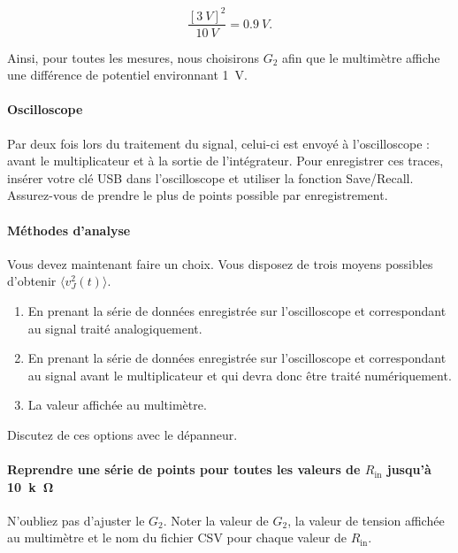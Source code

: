 \documentclass[12pt,oneside,letterpaper]{article}
\begin{document}
\begin{equation*}
\frac{[\SI{3}{V}]^2}{\SI{10}{V}}=\SI{0.9}{V}.
\end{equation*}


Ainsi, pour toutes les mesures, nous choisirons $G_2$ afin que le multimètre affiche une différence de potentiel environnant \SI{1}{V}.


\paragraph{Oscilloscope}Par deux fois lors du traitement du signal, celui-ci est envoyé à l'oscilloscope : avant le multiplicateur et à la sortie de l'intégrateur. Pour enregistrer ces traces, insérer votre clé USB dans l'oscilloscope et utiliser la fonction Save/Recall. Assurez-vous de prendre le plus de points possible par enregistrement.



\paragraph{Méthodes d'analyse} Vous devez maintenant faire un choix. Vous disposez de trois moyens possibles d'obtenir $\langle v_{J}^{2}\!\left(t\right) \rangle$.


\begin{enumerate}

\item En prenant la série de données enregistrée sur l'oscilloscope et correspondant au signal traité analogiquement.

\item En prenant la série de données enregistrée sur l'oscilloscope et correspondant au signal avant le multiplicateur et qui devra donc être traité numériquement.

\item La valeur affichée au multimètre.

\end{enumerate}


Discutez de ces options avec le dépanneur.


\paragraph{Reprendre une série de points pour toutes les valeurs de $R_{\mathrm{in}}$ jusqu'à \SI{10}{k\ohm}}N'oubliez pas d'ajuster le $G_2$. Noter la valeur de $G_2$, la valeur de tension affichée au multimètre et le nom du fichier CSV pour chaque valeur de $R_{\mathrm{in}}$.
\end{document}
